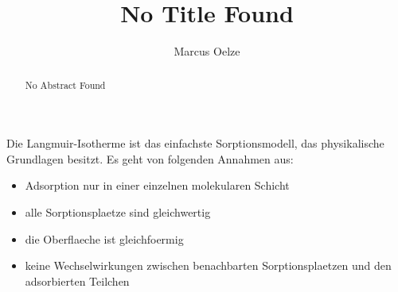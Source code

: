 \documentclass[preprint,review,12pt]{elsarticle}
\begin{document}
\begin{frontmatter}



\title{No Title Found}


\author[first]{Marcus Oelze}
\address[first]{GFZ Potsdam}




\begin{abstract}
No Abstract Found

\end{abstract}







\end{frontmatter}




Die Langmuir-Isotherme ist das einfachste Sorptionsmodell, das physikalische Grundlagen besitzt. 
Es geht von folgenden Annahmen aus:


\begin{itemize}
\item Adsorption nur in einer einzelnen molekularen Schicht
\item alle Sorptionsplaetze sind gleichwertig
\item die Oberflaeche ist gleichfoermig 
\item keine Wechselwirkungen zwischen benachbarten Sorptionsplaetzen und den adsorbierten Teilchen
\end{itemize}
\end{document}
